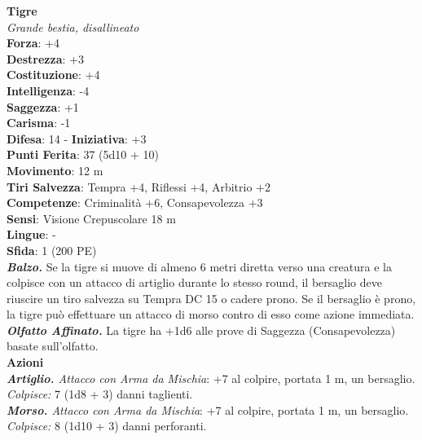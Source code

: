 \begin{multicols}{2}
\medskip\textbf{Tigre}\\
\emph{Grande bestia, disallineato}\\
\textbf{Forza}: +4\\
\textbf{Destrezza}: +3\\
\textbf{Costituzione}: +4\\
\textbf{Intelligenza}: -4\\
\textbf{Saggezza}: +1\\
\textbf{Carisma}: -1\\
\textbf{Difesa}: 14 - \textbf{Iniziativa}: +3\\
\textbf{Punti Ferita}: 37 (5d10 + 10)\\
\textbf{Movimento}: 12 m\\
\textbf{Tiri Salvezza}: Tempra +4, Riflessi +4, Arbitrio +2\\
\textbf{Competenze}: Criminalità +6, Consapevolezza +3\\
\textbf{Sensi}: Visione Crepuscolare 18 m\\
\textbf{Lingue}: -\\
\textbf{Sfida}: 1 (200 PE)\smallskip\\
\emph{\textbf{Balzo.}} Se la tigre si muove di almeno 6 metri diretta verso una creatura e la colpisce con un attacco di artiglio durante lo stesso round, il bersaglio deve riuscire un tiro salvezza su Tempra DC  15 o cadere prono. Se il bersaglio è prono, la tigre può effettuare un attacco di morso contro di esso come azione immediata.
\emph{\textbf{Olfatto Affinato.}} La tigre ha +1d6 alle prove di Saggezza (Consapevolezza) basate sull'olfatto.\\
\smallskip\textbf{Azioni}\\
\emph{\textbf{Artiglio.} Attacco con Arma da Mischia}: +7 al colpire, portata 1 m, un bersaglio.\\
\emph{Colpisce:} 7 (1d8 + 3) danni taglienti.\\
\emph{\textbf{Morso.} Attacco con Arma da Mischia}: +7 al colpire, portata 1 m, un bersaglio.\\
\emph{Colpisce:} 8 (1d10 + 3) danni perforanti.\\


\end{multicols}
